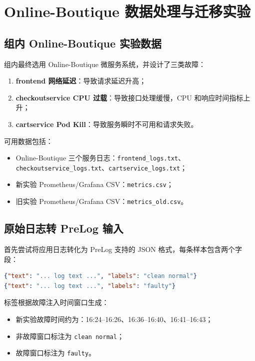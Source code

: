 \documentclass[UTF8,a4paper,12pt]{ctexart}
\begin{document}
\section{Online-Boutique 数据处理与迁移实验}

\subsection{组内 Online-Boutique 实验数据}

组内最终选用 Online-Boutique 微服务系统，并设计了三类故障：

\begin{enumerate}[label=\arabic*.]
    \item \textbf{frontend 网络延迟}：导致请求延迟升高；
    \item \textbf{checkoutservice CPU 过载}：导致接口处理缓慢，CPU 和响应时间指标上升；
    \item \textbf{cartservice Pod Kill}：导致服务瞬时不可用和请求失败。
\end{enumerate}

可用数据包括：

\begin{itemize}
    \item Online-Boutique 三个服务日志：\texttt{frontend\_logs.txt}、\texttt{checkoutservice\_logs.txt}、\texttt{cartservice\_logs.txt}；
    \item 新实验 Prometheus/Grafana CSV：\texttt{metrics.csv}；
    \item 旧实验 Prometheus/Grafana CSV：\texttt{metrics\_old.csv}。
\end{itemize}

\subsection{原始日志转 PreLog 输入}

首先尝试将应用日志转化为 PreLog 支持的 JSON 格式，每条样本包含两个字段：

\begin{lstlisting}[language=json]
{"text": "... log text ...", "labels": "clean normal"}
{"text": "... log text ...", "labels": "faulty"}
\end{lstlisting}

标签根据故障注入时间窗口生成：

\begin{itemize}
    \item 新实验故障时间约为：16:24--16:26、16:36--16:40、16:41--16:43；
    \item 非故障窗口标注为 \texttt{clean normal}；
    \item 故障窗口标注为 \texttt{faulty}。
\end{itemize}
\end{document}
